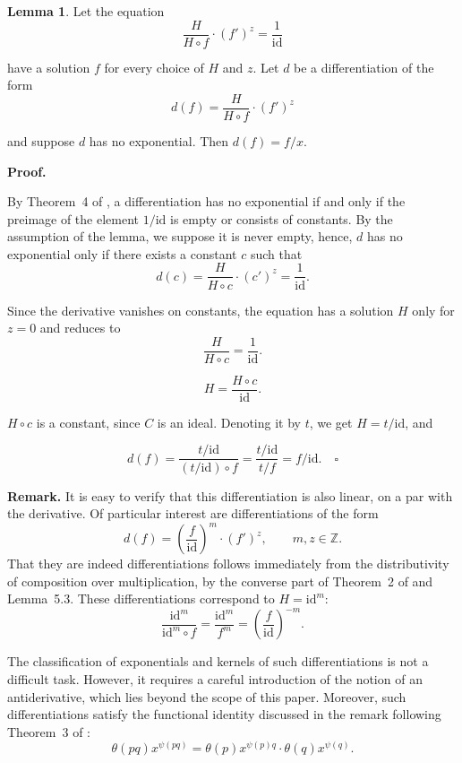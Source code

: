 \documentclass[12pt]{article}
\theoremstyle{definition}
\newtheorem{lemma}[definition]{Lemma}
\begin{document}
\vspace{10pt}
\begin{lemma}
Let the equation
\[
\frac{H}{H \circ f} \cdot (f')^z = \frac{1}{\mathrm{id}}
\]

have a solution \(f\) for every choice of \(H\) and \(z\). Let \(d\) be a differentiation of the form
\[
d(f) = \frac{H}{H \circ f} \cdot (f')^z
\]

and suppose \(d\) has no exponential. Then \(d(f) = f/x\).

\newpage
\textbf{Proof.} 

By Theorem~4 of \cite{umerov2025}, a differentiation has no exponential if and only if the preimage of the element \(1/\mathrm{id}\) 
is empty or consists of constants. By the assumption of the lemma, we suppose it is never empty, hence, 
\(d\) has no exponential only if there exists a constant \(c\) such that
\[
d(c) = \frac{H}{H \circ c} \cdot (c')^z = \frac{1}{\mathrm{id}}.
\]

Since the derivative vanishes on constants, the equation has a solution \(H\) only for \(z = 0\) and reduces to
\[
\frac{H}{H \circ c} = \frac{1}{\mathrm{id}}.
\]

\[
H = \frac{H \circ c}{\mathrm{id}}.
\]

\(H \circ c\) is a constant, since \(C\) is an ideal. Denoting it by \(t\), we get \(H = t / \mathrm{id}\), and

\[
d(f) = \frac{t / \mathrm{id}}{(t / \mathrm{id}) \circ f} = \frac{t / \mathrm{id}}{t / f} = f / \mathrm{id}. \quad \square
\]
\end{lemma}


\vspace{10pt}
\noindent\textbf{Remark.}
It is easy to verify that this differentiation is also linear, on a par with the derivative.
Of particular interest are differentiations of the form
\[
d(f) = \left( \frac{f}{\mathrm{id}} \right)^m \cdot (f')^z, \qquad m, z \in \mathbb{Z}.
\]
That they are indeed differentiations follows immediately from the distributivity of composition over multiplication, 
by the converse part of Theorem~2 of \cite{umerov2025} and Lemma~5.3. These differentiations correspond to \(H = \mathrm{id}^m\):
\[
\frac{\mathrm{id}^m}{\mathrm{id}^m \circ f} = \frac{\mathrm{id}^m}{f^m} = \left( \frac{f}{\mathrm{id}} \right)^{-m}.
\]

\vspace{10pt}
The classification of exponentials and kernels of such differentiations is not a difficult task. However, 
it requires a careful introduction of the notion of an antiderivative, 
which lies beyond the scope of this paper. Moreover, such differentiations 
satisfy the functional identity discussed in the remark following Theorem~3 of \cite{umerov2025}:
\[
\theta(pq) x^{\psi(pq)} = \theta(p) x^{\psi(p) q} \cdot \theta(q) x^{\psi(q)}.
\]
\end{document}
